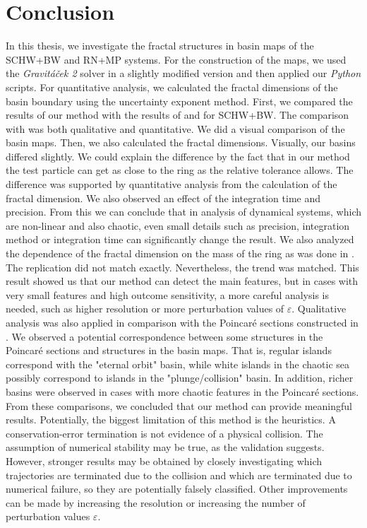 \chapter*{Conclusion}
In this thesis, we investigate the fractal structures in basin maps of the SCHW+BW and RN+MP systems. For the construction of the maps, we used the \textit{Gravitáček 2} solver in a slightly modified version and then applied our \textit{Python} scripts. For quantitative analysis, we calculated the fractal dimensions of the basin boundary using the uncertainty exponent method. 
First, we compared the results of our method with the results of \cite{Sychrovsky2020} and \cite{Polcar2019} for SCHW+BW. The comparison with \cite{Sychrovsky2020} was both qualitative and quantitative. We did a visual comparison of the basin maps. Then, we also calculated the fractal dimensions. Visually, our basins differed slightly. We could explain the difference by the fact that in our method the test particle can get as close to the ring as the relative tolerance allows. The difference was supported by quantitative analysis from the calculation of the fractal dimension. We also observed an effect of the integration time and precision. 
From this we can conclude that in analysis of dynamical systems, which are non-linear and also chaotic, even small details such as precision, integration method or integration time can significantly change the result. 
We also analyzed the dependence of the fractal dimension on the mass of the ring as was done in \cite{Sychrovsky2020}. The replication did not match exactly. Nevertheless, the trend was matched. This result showed us that our method can detect the main features, but in cases with very small features and high outcome sensitivity, a more careful analysis is needed, such as higher resolution or more perturbation values of $\varepsilon$.
Qualitative analysis was also applied in comparison with the Poincaré sections constructed in \cite{Polcar2019}. We observed a potential correspondence between some structures in the Poincaré sections and structures in the basin maps. That is, regular islands correspond with the "eternal orbit" basin, while white islands in the chaotic sea possibly correspond to islands in the "plunge/collision" basin. In addition, richer basins were observed in cases with more chaotic features in the Poincaré sections.
From these comparisons, we concluded that our method can provide meaningful results. Potentially, the biggest limitation of this method is the heuristics. A conservation-error termination is not evidence of a physical collision. The assumption of numerical stability may be true, as the validation suggests. However, stronger results may be obtained by closely investigating which trajectories are terminated due to the collision and which are terminated due to numerical failure, so they are potentially falsely classified. Other improvements can be made by increasing the resolution or increasing the number of perturbation values $\varepsilon$.
